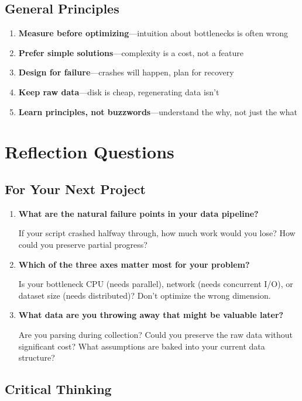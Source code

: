 \documentclass[11pt,a4paper]{article}
\begin{document}
\subsection{General Principles}

\begin{enumerate}
    \item \textbf{Measure before optimizing}—intuition about bottlenecks is often wrong
    \item \textbf{Prefer simple solutions}—complexity is a cost, not a feature
    \item \textbf{Design for failure}—crashes will happen, plan for recovery
    \item \textbf{Keep raw data}—disk is cheap, regenerating data isn't
    \item \textbf{Learn principles, not buzzwords}—understand the why, not just the what
\end{enumerate}

\section{Reflection Questions}

\subsection{For Your Next Project}

\begin{enumerate}
    \item \textbf{What are the natural failure points in your data pipeline?}

    If your script crashed halfway through, how much work would you lose? How could you preserve partial progress?

    \item \textbf{Which of the three axes matter most for your problem?}

    Is your bottleneck CPU (needs parallel), network (needs concurrent I/O), or dataset size (needs distributed)? Don't optimize the wrong dimension.

    \item \textbf{What data are you throwing away that might be valuable later?}

    Are you parsing during collection? Could you preserve the raw data without significant cost? What assumptions are baked into your current data structure?
\end{enumerate}

\subsection{Critical Thinking}
\end{document}
